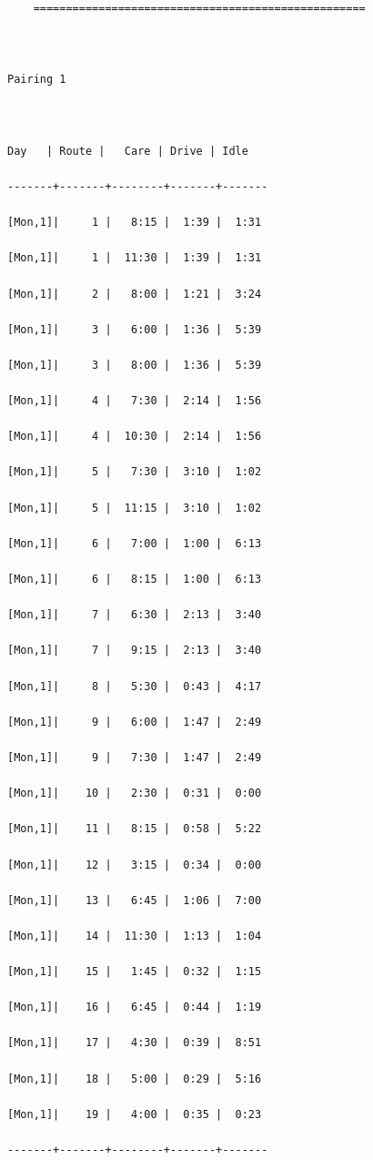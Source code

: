 \documentclass[11pt,twoside]{article}
\numberwithin{Theorem}{section}
\numberwithin{Definition}{section}
\numberwithin{Lemma}{section}
\numberwithin{Algorithm}{section}
\numberwithin{equation}{section}
\begin{document}
\begin{verbatim}
	===================================================

 

Pairing 1

 

Day   | Route |   Care | Drive | Idle

-------+-------+--------+-------+-------

[Mon,1]|     1 |   8:15 |  1:39 |  1:31

[Mon,1]|     1 |  11:30 |  1:39 |  1:31

[Mon,1]|     2 |   8:00 |  1:21 |  3:24

[Mon,1]|     3 |   6:00 |  1:36 |  5:39

[Mon,1]|     3 |   8:00 |  1:36 |  5:39

[Mon,1]|     4 |   7:30 |  2:14 |  1:56

[Mon,1]|     4 |  10:30 |  2:14 |  1:56

[Mon,1]|     5 |   7:30 |  3:10 |  1:02

[Mon,1]|     5 |  11:15 |  3:10 |  1:02

[Mon,1]|     6 |   7:00 |  1:00 |  6:13

[Mon,1]|     6 |   8:15 |  1:00 |  6:13

[Mon,1]|     7 |   6:30 |  2:13 |  3:40

[Mon,1]|     7 |   9:15 |  2:13 |  3:40

[Mon,1]|     8 |   5:30 |  0:43 |  4:17

[Mon,1]|     9 |   6:00 |  1:47 |  2:49

[Mon,1]|     9 |   7:30 |  1:47 |  2:49

[Mon,1]|    10 |   2:30 |  0:31 |  0:00

[Mon,1]|    11 |   8:15 |  0:58 |  5:22

[Mon,1]|    12 |   3:15 |  0:34 |  0:00

[Mon,1]|    13 |   6:45 |  1:06 |  7:00

[Mon,1]|    14 |  11:30 |  1:13 |  1:04

[Mon,1]|    15 |   1:45 |  0:32 |  1:15

[Mon,1]|    16 |   6:45 |  0:44 |  1:19

[Mon,1]|    17 |   4:30 |  0:39 |  8:51

[Mon,1]|    18 |   5:00 |  0:29 |  5:16

[Mon,1]|    19 |   4:00 |  0:35 |  0:23

-------+-------+--------+-------+-------


\end{verbatim}
\end{document}

